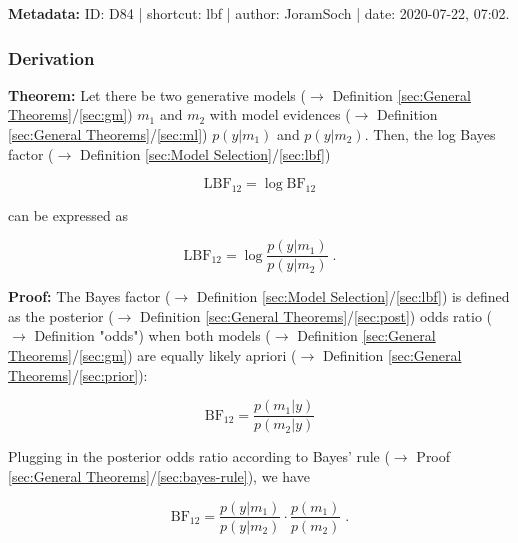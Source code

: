 \documentclass[a4paper,12pt,twoside]{book}
\begin{document}
\vspace{1em}
\textbf{Metadata:} ID: D84 | shortcut: lbf | author: JoramSoch | date: 2020-07-22, 07:02.
\vspace{1em}



\subsubsection[\textbf{Derivation}]{Derivation} \label{sec:lbf-der}
\setcounter{equation}{0}

\textbf{Theorem:} Let there be two generative models ($\rightarrow$ Definition \ref{sec:General Theorems}/\ref{sec:gm}) $m_1$ and $m_2$ with model evidences ($\rightarrow$ Definition \ref{sec:General Theorems}/\ref{sec:ml}) $p(y \vert m_1)$ and $p(y \vert m_2)$. Then, the log Bayes factor ($\rightarrow$ Definition \ref{sec:Model Selection}/\ref{sec:lbf})

\begin{equation} \label{eq:lbf-der-LBF-term}
\mathrm{LBF}_{12} = \log \mathrm{BF}_{12}
\end{equation}

can be expressed as

\begin{equation} \label{eq:lbf-der-LBF-ratio}
\mathrm{LBF}_{12} = \log \frac{p(y|m_1)}{p(y|m_2)} \; .
\end{equation}


\vspace{1em}
\textbf{Proof:} The Bayes factor ($\rightarrow$ Definition \ref{sec:Model Selection}/\ref{sec:lbf}) is defined as the posterior ($\rightarrow$ Definition \ref{sec:General Theorems}/\ref{sec:post}) odds ratio ($\rightarrow$ Definition "odds") when both models ($\rightarrow$ Definition \ref{sec:General Theorems}/\ref{sec:gm}) are equally likely apriori ($\rightarrow$ Definition \ref{sec:General Theorems}/\ref{sec:prior}):

\begin{equation} \label{eq:lbf-der-BF-s1}
\mathrm{BF}_{12} = \frac{p(m_1|y)}{p(m_2|y)}
\end{equation}

Plugging in the posterior odds ratio according to Bayes' rule ($\rightarrow$ Proof \ref{sec:General Theorems}/\ref{sec:bayes-rule}), we have

\begin{equation} \label{eq:lbf-der-BF-s2}
\mathrm{BF}_{12} = \frac{p(y|m_1)}{p(y|m_2)} \cdot \frac{p(m_1)}{p(m_2)} \; .
\end{equation}
\end{document}
